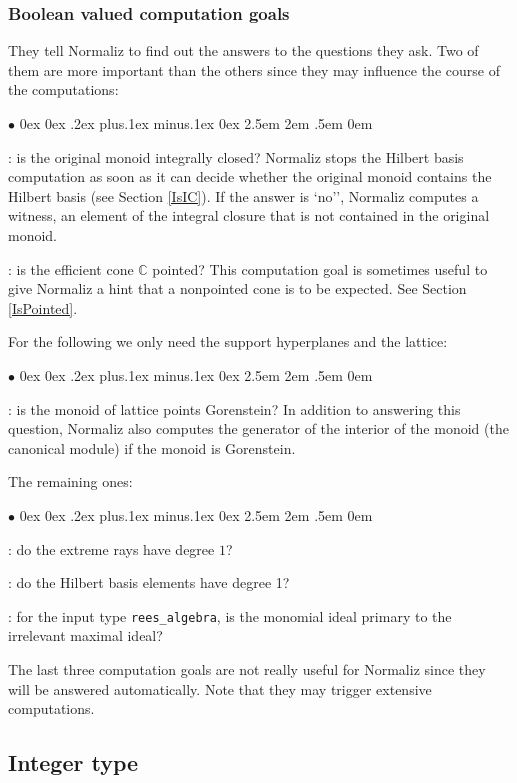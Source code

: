 \documentclass[12pt,a4paper]{scrartcl}
\newcommand{\stdli}{ \topsep0ex \partopsep0ex %
\parsep.2ex plus.1ex minus.1ex \itemsep0ex%
\leftmargin2.5em \labelwidth2em \labelsep.5em \rightmargin0em}%
\renewenvironment{itemize}{\begin{list}{{$\bullet$}}{\stdli}}{\end{list}}
\theoremstyle{definition}
\def\CC{{\mathbb C}}
\def\itemtt[#1]{\item[\textbf{\ttt{#1}}]}
\def\ttt{\texttt}
\begin{document}
\subsubsection{Boolean valued computation goals}\label{bool}

They tell Normaliz to find out the answers to the questions they ask. Two of them are more important than the others since they may influence the course of the computations:

\begin{itemize}
	\itemtt[IsIntegrallyClosed, -w]: is the original monoid integrally closed? Normaliz stops the Hilbert basis computation as soon as it can decide whether the original monoid contains the Hilbert basis (see Section \ref{IsIC}). If the answer is `no'', Normaliz computes a witness, an element of the integral closure that is not contained in the original monoid.
	
	\itemtt[IsPointed]: is the efficient cone $\CC$ pointed? This computation goal is sometimes useful to give Normaliz a hint that a nonpointed cone is to be expected. See Section \ref{IsPointed}.
\end{itemize}

For the following we only need the support hyperplanes and the lattice:

\begin{itemize}
	\itemtt[IsGorenstein, -G]: is the monoid of lattice points Gorenstein? In addition to answering this question, Normaliz also computes the generator of the interior of the monoid (the canonical module) if the monoid is Gorenstein.
\end{itemize}

The remaining ones:

\begin{itemize}
	
	\itemtt[IsDeg1ExtremeRays]: do the extreme rays have degree $1$?
	
	\itemtt[IsDeg1HilbertBasis]: do the Hilbert basis elements have degree 1?
	
	\itemtt[IsReesPrimary]: for the input type \verb|rees_algebra|, is the monomial ideal primary to the irrelevant maximal ideal?
	
\end{itemize}

The last three computation goals are not really useful for Normaliz since they will be answered automatically. Note that they may trigger extensive computations.

\subsection{Integer type}\label{Integer}
\end{document}

